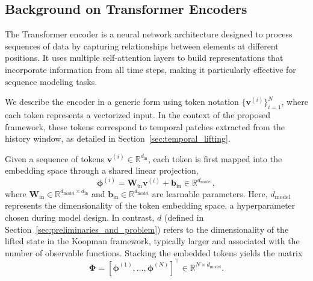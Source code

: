 \documentclass[journal]{IEEEtran}
\newcommand{\vb}{\mathbf{b}}
\newcommand{\vphi}{\boldsymbol{\phi}}
\newcommand{\mW}{\mathbf{W}}
\newcommand{\mPhi}{\boldsymbol{\Phi}}
\begin{document}
\subsection{Background on Transformer Encoders}
\label{sec:transformer_background}

The Transformer encoder \cite{vaswani2017attention} is a neural network architecture designed to process sequences of data by capturing relationships between elements at different positions. It uses multiple self-attention layers to build representations that incorporate information from all time steps, making it particularly effective for sequence modeling tasks.

We describe the encoder in a generic form using token notation $\{\mathbf{v}^{(i)}\}_{i=1}^{N}$, where each token represents a vectorized input. In the context of the proposed framework, these tokens correspond to temporal patches extracted from the history window, as detailed in Section~\ref{sec:temporal_lifting}.

Given a sequence of tokens $\mathbf{v}^{(i)} \in \mathbb{R}^{d_{\mathrm{in}}}$, each token is first mapped into the embedding space through a shared linear projection, 
\begin{equation}
    \vphi^{(i)} = \mW_{\mathrm{in}} \mathbf{v}^{(i)} + \vb_{\mathrm{in}} \in \mathbb{R}^{d_{\mathrm{model}}},
    \label{eq:general_embed}
\end{equation}
where $\mW_{\mathrm{in}} \in \mathbb{R}^{d_{\mathrm{model}} \times d_{\mathrm{in}}}$ and $\vb_{\mathrm{in}} \in \mathbb{R}^{d_{\mathrm{model}}}$ are learnable parameters. Here, $d_{\mathrm{model}}$ represents the dimensionality of the token embedding space, a hyperparameter chosen during model design. In contrast, $d$ (defined in Section~\ref{sec:preliminaries_and_problem}) refers to the dimensionality of the lifted state in the Koopman framework, typically larger and associated with the number of observable functions. Stacking the embedded tokens yields the matrix
\begin{equation}
    \mPhi = [\vphi^{(1)}, \ldots, \vphi^{(N)}]^\top
    \in \mathbb{R}^{N \times d_{\mathrm{model}}}.
\end{equation}
\end{document}
